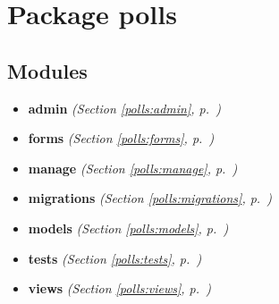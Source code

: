 %
%
%


\section{Package polls}

    \label{polls}


\subsection{Modules}

\begin{itemize}
\setlength{\parskip}{0ex}
\item \textbf{admin}
  \textit{(Section \ref{polls:admin}, p.~\pageref{polls:admin})}

\item \textbf{forms}
  \textit{(Section \ref{polls:forms}, p.~\pageref{polls:forms})}

\item \textbf{manage}
  \textit{(Section \ref{polls:manage}, p.~\pageref{polls:manage})}

\item \textbf{migrations}
  \textit{(Section \ref{polls:migrations}, p.~\pageref{polls:migrations})}

\item \textbf{models}
  \textit{(Section \ref{polls:models}, p.~\pageref{polls:models})}

\item \textbf{tests}
  \textit{(Section \ref{polls:tests}, p.~\pageref{polls:tests})}

\item \textbf{views}
  \textit{(Section \ref{polls:views}, p.~\pageref{polls:views})}

\end{itemize}


